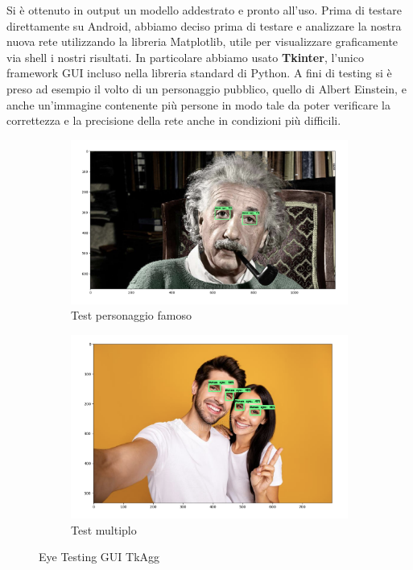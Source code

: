 \documentclass[11pt]{article}
\begin{document}
Si è ottenuto in output un modello addestrato e pronto all’uso.
\newline \newline
Prima di testare direttamente su Android, abbiamo deciso prima di testare e analizzare la nostra nuova rete utilizzando la libreria Matplotlib, utile per visualizzare graficamente via shell i nostri risultati. In particolare abbiamo usato \textbf{Tkinter}, l'unico framework GUI incluso nella libreria standard di Python.
\newline
A fini di testing si è preso ad esempio il volto di un
personaggio pubblico, quello di Albert Einstein, e anche un'immagine contenente più persone in modo tale da poter verificare la correttezza e la precisione della rete anche in condizioni più difficili. 



\begin{figure}
\begin{subfigure}{0.5\textwidth}
  \centering
  \includegraphics[width=1\linewidth]{img/einstein.png}
  \caption{Test personaggio famoso}
  \label{fig:sfig1}
\end{subfigure}%
\begin{subfigure}{0.5\textwidth}
  \centering
  \includegraphics[width=1\linewidth]{img/gruppo.png}
  \caption{Test multiplo}
  \label{fig:sfig2}
\end{subfigure}
\caption{Eye Testing GUI TkAgg}
\label{fig:fig}
\end{figure}
\end{document}
